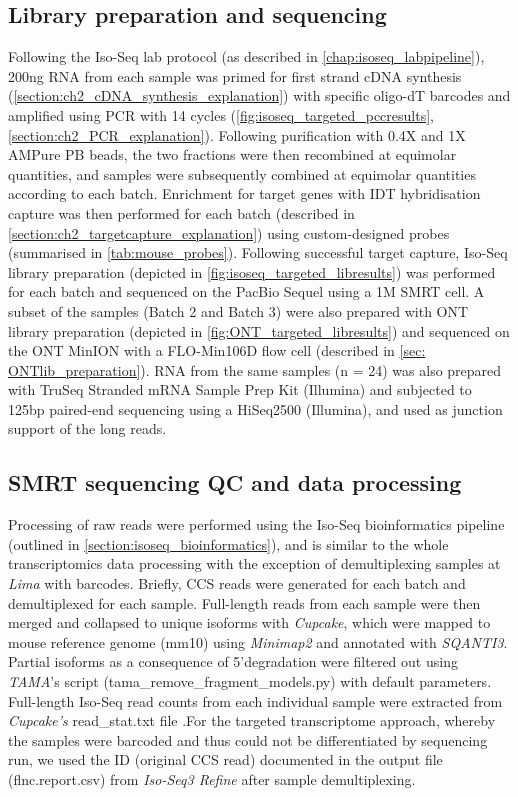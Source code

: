 \subsection{Library preparation and sequencing}
Following the Iso-Seq lab protocol (as described in \cref{chap:isoseq_labpipeline}), 200ng RNA from each sample was primed for first strand cDNA synthesis (\cref{section:ch2_cDNA_synthesis_explanation}) with specific oligo-dT barcodes and amplified using PCR with 14 cycles (\cref{fig:isoseq_targeted_pccresults}, \cref{section:ch2_PCR_explanation}). Following purification with 0.4X and 1X AMPure PB beads, the two fractions were then recombined at equimolar quantities, and samples were subsequently combined at equimolar quantities according to each batch. Enrichment for target genes with IDT hybridisation capture was then performed for each batch (described in \cref{section:ch2_targetcapture_explanation}) using custom-designed probes (summarised in \cref{tab:mouse_probes}). Following successful target capture, Iso-Seq library preparation (depicted in \cref{fig:isoseq_targeted_libresults}) was performed for each batch and sequenced on the PacBio Sequel using a 1M SMRT cell. A subset of the samples (Batch 2 and Batch 3) were also prepared with ONT library preparation (depicted in \cref{fig:ONT_targeted_libresults}) and sequenced on the ONT MinION with a FLO-Min106D flow cell (described in \cref{sec: ONTlib_preparation}). RNA from the same samples (n = 24) was also prepared with TruSeq Stranded mRNA Sample Prep Kit (Illumina) and subjected to 125bp paired-end sequencing using a HiSeq2500 (Illumina), and used as junction support of the long reads. 

\subsection{SMRT sequencing QC and data processing}
Processing of raw reads were performed using the Iso-Seq bioinformatics pipeline (outlined in \cref{section:isoseq_bioinformatics}), and is similar to the whole transcriptomics data processing with the exception of demultiplexing samples at \textit{Lima} with barcodes. Briefly, CCS reads were generated for each batch and demultiplexed for each sample. Full-length reads from each sample were then merged and collapsed to unique isoforms with \textit{Cupcake}, which were mapped to mouse reference genome (mm10) using \textit{Minimap2} and annotated with \textit{SQANTI3}. Partial isoforms as a consequence of 5'degradation were filtered out using \textit{TAMA}'s script (tama\_remove\_fragment\_models.py) with default parameters. Full-length Iso-Seq read counts from each individual sample were extracted from \textit{Cupcake's} read\_stat.txt file .For the targeted transcriptome approach, whereby the samples were barcoded and thus could not be differentiated by sequencing run, we used the ID (original CCS read) documented in the output file (flnc.report.csv) from \textit{Iso-Seq3 Refine} after sample demultiplexing. 

